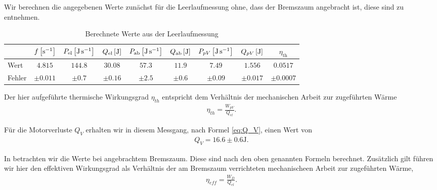 Wir berechnen die angegebenen Werte zunächst für die Leerlaufmessung ohne, dass der Bremszaum angebracht ist, diese sind  zu entnehmen. 

\begin{table}[h!]
    \centering
    \begin{tabular}{l | c | c | c | c | c | c | c | c}
    \textbf{} & \boldmath$f\,\qty[\si{\per\second}]$ & \boldmath$P_{\text{el}}\,\qty[\si{\joule\per\second}]$ & \boldmath$Q_{\text{el}}\,\qty[\si{\joule}]$ & \boldmath$P_{\text{ab}}\,\qty[\si{\joule\per\second}]$ & \boldmath$Q_{\text{ab}}\,\qty[\si{\joule}]$ & \boldmath$P_{pV}\,\qty[\si{\joule\per\second}]$ & \boldmath$Q_{pV}\,\qty[\si{\joule}]$ & \boldmath$\eta_{\text{th}}$ \\\hline
    Wert & $4.815$ & $144.8$ & $30.08$ & $57.3$ & $11.9$ & $7.49$ & $1.556$ & $0.0517$ \\\hline
    Fehler & $\pm 0.011$ & $\pm 0.7$ & $\pm 0.16$ & $\pm 2.5$ & $\pm 0.6$ & $\pm 0.09$ & $\pm 0.017$ & $\pm 0.0007$ \\
    \end{tabular}
    \caption{Berechnete Werte aus der Leerlaufmessung}
    \label{tab:werte_leerlauf}
\end{table}

Der hier aufgeführte thermische Wirkungsgrad $\eta_{th}$ entspricht dem Verhältnis der mechanischen Arbeit zur zugeführten Wärme
\begin{align}
    \eta_{th} = \frac{W_{pV}}{Q_{el}}.
\end{align}

Für die Motorverluste $Q_V$ erhalten wir in diesem Messgang, nach Formel \eqref{eq:Q_V}, einen Wert von
\begin{align}
    Q_V = 16.6 \pm 0.6 \si{\joule}.
\end{align}

In  betrachten wir die Werte bei angebrachtem Bremszaum. Diese sind nach den oben genannten Formeln berechnet. Zusätzlich gilt führen wir hier den effektiven Wirkungsgrad als Verhältnis der am Bremszaum verrichteten mechanischeen Arbeit zur zugeführten Wärme,
\begin{align}
    \eta_{eff} = \frac{W_D}{Q_{el}}.
\end{align}

